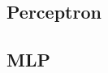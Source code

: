 \documentclass[bsc,frontabs,twoside,singlespacing,parskip,deptreport]{infthesis}     %
\begin{document}
 \subsection{Perceptron}
 \subsection{MLP}


\end{document}
